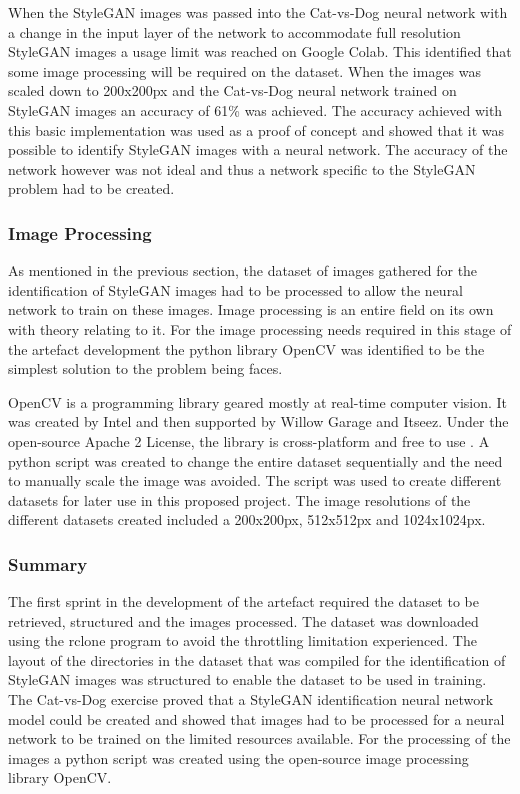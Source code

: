 When the StyleGAN images was passed into the Cat-vs-Dog neural network with a change in the input layer of the network to accommodate full resolution StyleGAN images a usage limit was reached on Google Colab. This identified that some image processing will be required on the dataset. When the images was scaled down to 200x200px and the Cat-vs-Dog neural network trained on StyleGAN images an accuracy of 61\% was achieved. The accuracy achieved with this basic implementation was used as a proof of concept and showed that it was possible to identify StyleGAN images with a neural network. The accuracy of the network however was not ideal and thus a network specific to the StyleGAN problem had to be created.

\subsubsection{Image Processing}

As mentioned in the previous section, the dataset of images gathered for the identification of StyleGAN images had to be processed to allow the neural network to train on these images. Image processing is an entire field on its own with theory relating to it. For the image processing needs required in this stage of the artefact development the python library OpenCV was identified to be the simplest solution to the problem being faces. 

OpenCV is a programming library geared mostly at real-time computer vision. It was created by Intel and then supported by Willow Garage and Itseez. Under the open-source Apache 2 License, the library is cross-platform and free to use \citep{opencv2012}. A python script was created to change the entire dataset sequentially and the need to manually scale the image was avoided. The script was used to create different datasets for later use in this proposed project. The image resolutions of the different datasets created included a 200x200px, 512x512px and 1024x1024px.


\subsubsection{Summary}

The first sprint in the development of the artefact required the dataset to be retrieved, structured and the images processed. The dataset was downloaded using the rclone program to avoid the throttling limitation experienced. The layout of the directories in the dataset that was compiled for the identification of StyleGAN images was structured to enable the dataset to be used in training. The Cat-vs-Dog exercise proved that a StyleGAN identification neural network model could be created and showed that images had to be processed for a neural network to be trained on the limited resources available. For the processing of the images a python script was created using the open-source image processing library OpenCV.

